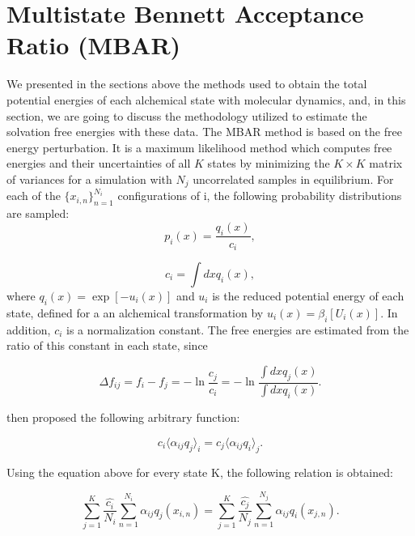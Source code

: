 \section{Multistate Bennett Acceptance Ratio (MBAR)}\label{mbar}

We presented in the sections above the methods used to obtain the total potential energies of each alchemical state with molecular dynamics, and, in this section, we are going to discuss the methodology utilized to estimate the solvation free energies with these data. The MBAR method \cite{mbar} is based on the free energy perturbation. It is a maximum likelihood method which computes free energies and their uncertainties of all $K$ states by minimizing the $K \times K$ matrix of variances for a simulation with $N_{j}$ uncorrelated samples in equilibrium. For each of the $\lbrace x_{i,n } \rbrace ^{N_{i}}_{n=1 }$ configurations of i, the following probability distributions are sampled:
\begin{equation}
p_{i}(x) = \frac{q_{i}(x)}{c_{i}},
\end{equation}

\begin{equation}
c_{i} = \int dx q_{i}(x),
\end{equation}
where $q_{i}(x)=\exp[-u_{i}(x)]$ and $u_{i}$ is the reduced potential energy of each state, defined for a an alchemical transformation by $u_{i} (x)= \beta_{i} [U_{i}(x)]$. In addition, $c_{i}$ is a normalization constant.  The free energies are estimated from the ratio of this constant in each state, since

\begin{equation}
\Delta f_{ij} = f_{i} - f_{j} = - \ln \frac{c_{j}}{c_{i}}  = -\ln \frac{\int dx q_{j}(x)}{\int dx q_{i}(x)} .
\label{eqn:mbar1}
\end{equation}

 then proposed the following arbitrary function:

\begin{equation}
c_{i} \langle \alpha _{ij} q_{j} \rangle _{i}  =  c_{j} \langle \alpha _{ij} q_{i} \rangle _{j} .
\end{equation}

Using the equation above for every state  K, the following relation is obtained:

\begin{equation}
\label{eq:mbar1}
\sum_{j=1}^{K} \frac{\hat{c_{i}}}{N_{i}} \sum_{n=1}^{N_{i}} \alpha _{ij} q_{j} (x_{i,n}) =  \sum_{j=1}^{K} \frac{\hat{c_{j}}}{N_{j}} \sum_{n=1}^{N_{j}} \alpha _{ij} q_{i} (x_{j,n}) .
\end{equation}

